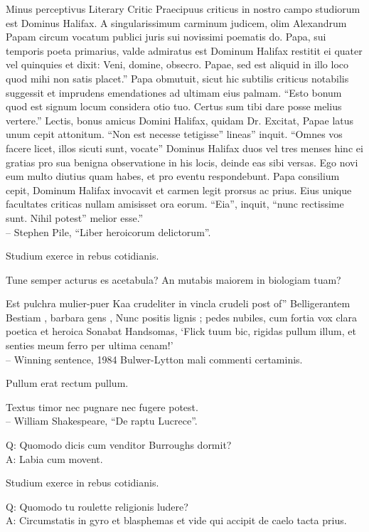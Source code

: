 \documentclass[titlepage,12pt]{memoir}
\begin{document}
Minus perceptivus Literary Critic
Praecipuus criticus in nostro campo studiorum est Dominus Halifax. A
singularissimum carminum judicem, olim Alexandrum Papam circum vocatum
publici juris sui novissimi poematis do.
Papa, sui temporis poeta primarius, valde admiratus est Dominum
Halifax restitit ei quater vel quinquies et dixit: Veni, domine, obsecro.
Papae, sed est aliquid in illo loco quod mihi non satis placet.”
Papa obmutuit, sicut hic subtilis criticus notabilis suggessit
et imprudens emendationes ad ultimam eius palmam. “Esto bonum quod est signum
locum considera otio tuo. Certus sum tibi dare posse melius
vertere.”
Lectis, bonus amicus Domini Halifax, quidam Dr.
Excitat, Papae latus unum cepit attonitum. “Non est necesse tetigisse”
lineas” inquit. “Omnes vos facere licet, illos sicuti sunt, vocate”
Dominus Halifax duos vel tres menses hinc ei gratias pro sua benigna observatione
in his locis, deinde eas sibi versas. Ego novi eum
multo diutius quam habes, et pro eventu respondebunt.
Papa consilium cepit, Dominum Halifax invocavit et carmen legit
prorsus ac prius. Eius unique facultates criticas nullam amisisset
ora eorum. “Eia”, inquit, “nunc rectissime sunt. Nihil potest”
melior esse.”
\\-- Stephen Pile, “Liber heroicorum delictorum”.

Studium exerce in rebus cotidianis.

Tune semper acturus es acetabula? An mutabis maiorem in biologiam tuam?

Est pulchra mulier-puer Kaa crudeliter in vincla crudeli post of”
Belligerantem Bestiam , barbara gens , Nunc positis lignis ;
pedes nubiles, cum fortia vox clara poetica et heroica
Sonabat Handsomas, ‘Flick tuum bic, rigidas pullum illum, et senties meum
ferro per ultima cenam!’
\\-- Winning sentence, 1984 Bulwer-Lytton mali commenti certaminis.

Pullum erat rectum pullum.

Textus timor nec pugnare nec fugere potest.
\\-- William Shakespeare, “De raptu Lucrece”.

Q: Quomodo dicis cum venditor Burroughs dormit?\\
A: Labia cum movent.

Studium exerce in rebus cotidianis.

Q: Quomodo tu roulette religionis ludere?\\
A: Circumstatis in gyro et blasphemas et vide qui accipit
de caelo tacta prius.
\end{document}
